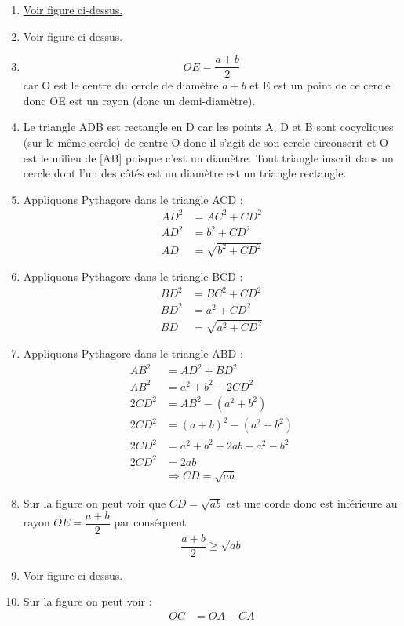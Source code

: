 \documentclass[11pt]{article}
\begin{document}
\begin{enumerate}
\item \hyperref[org8d23b4e]{Voir figure ci-dessus.}
\item \hyperref[org8d23b4e]{Voir figure ci-dessus.}
\item \[OE = \dfrac{a + b}{2}\] car O est le centre du cercle de diamètre
\(a + b\) et E est un point de ce cercle donc OE est un rayon (donc
un demi-diamètre).
\item Le triangle ADB est rectangle en D car les points A, D et B sont
cocycliques (sur le même cercle) de centre O donc il s'agit de son
cercle circonscrit et O est le milieu de [AB] puisque c'est un
diamètre. Tout triangle inscrit dans un cercle dont l'un des côtés
est un diamètre est un triangle rectangle.
\item Appliquons Pythagore dans le triangle ACD : 
\begin{align*}
	AD^2 &= AC^2 + CD^2 \\
	AD^2 &= b^2 + CD^2 \\
	AD &= \sqrt{b^2 + CD^2}
\end{align*}
\item Appliquons Pythagore dans le triangle BCD : 
\begin{align*}
	BD^2 &= BC^2 + CD^2 \\
	BD^2 &= a^2 + CD^2 \\
	BD &= \sqrt{a^2 + CD^2}
\end{align*}
\item Appliquons Pythagore dans le triangle ABD : 
\begin{align*}
	AB^2 &= AD^2 + BD^2 \\
	AB^2 &= a^2 + b^2 + 2CD^2 \\
	2CD^2 &= AB^2 - (a^2 + b^2) \\
	2CD^2 &= (a + b)^2 - (a^2 + b^2) \\
	2CD^2 &= a^2 + b^2 + 2ab - a^2 - b^2\\
	2CD^2 &= 2ab \\
	&\Rightarrow \boxed{CD = \sqrt{ab}}
\end{align*}
\item Sur la figure on peut voir que \(CD = \sqrt{ab}\) est une corde donc
est inférieure au rayon \(OE = \dfrac{a + b}{2}\) par conséquent
\[\dfrac{a + b}{2}\geq \sqrt{ab}\]
\item \hyperref[org8d23b4e]{Voir figure ci-dessus.}
\item Sur la figure on peut voir : 
\begin{align*}
	OC &= OA - CA\\

\end{align*}
\end{enumerate}
\end{document}
